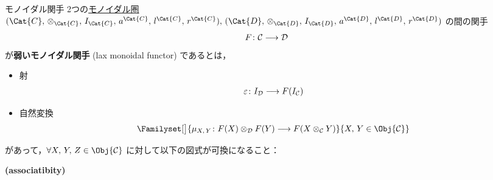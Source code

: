 \documentclass[TQFT_main]{subfiles}
\begin{document}
    \begin{mydef}[label=redef:monidal-functor,breakable]{モノイダル関手}
        2つの\hyperref[def:monoidal-category]{モノイダル圏} $(\Cat{C},\, \otimes_{\Cat{C}},\, I_{\Cat{C}},\, a^{\Cat{C}},\, l^{\Cat{C}},\, r^{\Cat{C}}),\, (\Cat{D},\, \otimes_{\Cat{D}},\, I_{\Cat{D}},\, a^{\Cat{D}},\, l^{\Cat{D}},\, r^{\Cat{D}})$ の間の関手
        \begin{align}
            F \colon \mathcal{C} \longrightarrow \mathcal{D}
        \end{align}
        が\textbf{弱いモノイダル関手} (lax monoidal functor) であるとは，
        \begin{itemize}
            \item 射
            \begin{align}
                \varepsilon \colon I_{\mathcal{D}} \longrightarrow F(I_{\mathcal{C}})
            \end{align}
            
            \item 自然変換
            \begin{align}
                \Familyset[\big]{\mu_{X,\, Y} \colon F(X) \otimes_{\mathcal{D}} F(Y) \lto F(X \otimes_{\mathcal{C}} Y)}{X,\, Y \in \Obj{\mathcal{C}}}
            \end{align}
        \end{itemize}
        があって，$\forall X,\, Y,\, Z \in \Obj{\mathcal{C}}$ に対して以下の図式が可換になること：
        \begin{description}
            \item[\textbf{(associatibity)}]　
            
            \begin{center}
            \end{center}
            

\end{description}
\end{mydef}
\end{document}
